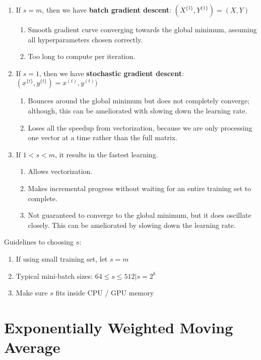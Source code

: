 \documentclass{article}
\begin{document}
\begin{enumerate}
\item If $s = m$, then we have \textbf{batch gradient descent}: $(X^{\{1\}}, Y^{\{1\}}) = (X, Y)$
  \begin{enumerate}
  \item Smooth gradient curve converging towards the global minimum,
        assuming all hyperparameters chosen correctly.
  \item Too long to compute per iteration.
  \end{enumerate}
\item If $s = 1$, then we have \textbf{stochastic gradient descent}: $(x^{\{t\}}, y^{\{t\}}) = x^{(t)}, y^{(t)})$
  \begin{enumerate}
  \item Bounces around the global minimum but does not completely converge; although, this can be ameliorated with slowing down the learning rate.
  \item Loses all the speedup from vectorization, because we are only processing one vector at a time rather than the full matrix.
  \end{enumerate}
\item If $1 < s < m$, it results in the fastest learning.
  \begin{enumerate}
  \item Allows vectorization.
  \item Makes incremental progress without waiting for an entire training set to complete.
  \item Not guaranteed to converge to the global minimum, but it does oscillate closely.  This can be ameliorated by slowing down the learning rate.
  \end{enumerate}
\end{enumerate}

Guidelines to choosing $s$:

\begin{enumerate}
\item If using small training set, let $s = m$
\item Typical mini-batch sizes: $64 \leq s \leq 512 | s = 2^k$
\item Make sure $s$ fits inside CPU / GPU memory
\end{enumerate}

\section{Exponentially Weighted Moving Average}
\end{document}
